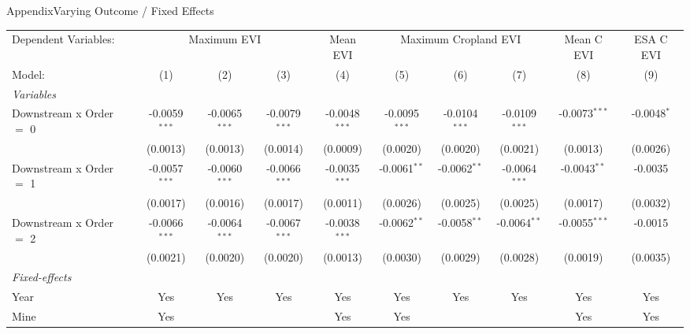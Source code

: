 \documentclass[aspectratio=169,11pt,dvipsnames, handout]{beamer}
\begin{document}
\begin{frame}{\textcolor{defaultclr!30}{Appendix}\hspace{0.75em}Varying Outcome / Fixed Effects}
\label{frame:outfedef}

\begin{adjustbox}{width = \textwidth, center}
   \begin{tabular}{lccccccccc}\label{tab:rob_y-FE_order}
      \tabularnewline \midrule \midrule
      Dependent Variables: & \multicolumn{3}{c}{Maximum EVI} & Mean EVI & \multicolumn{3}{c}{Maximum Cropland EVI} & Mean C EVI & ESA C EVI\\
      Model: & (1) & (2) & (3) & (4) & (5) & (6) & (7) & (8) & (9)\\  
      \midrule
      \emph{Variables}\\
      Downstream x Order $=$ 0 & -0.0059$^{***}$ & -0.0065$^{***}$ & -0.0079$^{***}$ & -0.0048$^{***}$ & -0.0095$^{***}$ & -0.0104$^{***}$ & -0.0109$^{***}$ & -0.0073$^{***}$ & -0.0048$^{*}$\\   
                                & (0.0013)        & (0.0013)        & (0.0014)        & (0.0009)        & (0.0020)        & (0.0020)        & (0.0021)        & (0.0013)        & (0.0026)\\   
      Downstream x Order $=$ 1 & -0.0057$^{***}$ & -0.0060$^{***}$ & -0.0066$^{***}$ & -0.0035$^{***}$ & -0.0061$^{**}$  & -0.0062$^{**}$  & -0.0064$^{***}$ & -0.0043$^{**}$  & -0.0035\\   
                                & (0.0017)        & (0.0016)        & (0.0017)        & (0.0011)        & (0.0026)        & (0.0025)        & (0.0025)        & (0.0017)        & (0.0032)\\   
      Downstream x Order $=$ 2 & -0.0066$^{***}$ & -0.0064$^{***}$ & -0.0067$^{***}$ & -0.0038$^{***}$ & -0.0062$^{**}$  & -0.0058$^{**}$  & -0.0064$^{**}$  & -0.0055$^{***}$ & -0.0015\\   
                                & (0.0021)        & (0.0020)        & (0.0020)        & (0.0013)        & (0.0030)        & (0.0029)        & (0.0028)        & (0.0019)        & (0.0035)\\   
      \midrule
      \emph{Fixed-effects}\\
      Year                      & Yes             & Yes             & Yes             & Yes             & Yes             & Yes             & Yes             & Yes             & Yes\\  
      Mine                      & Yes             &                 &                 & Yes             & Yes             &                 &                 & Yes             & Yes\\  

\end{tabular}
\end{adjustbox}
\end{frame}
\end{document}

